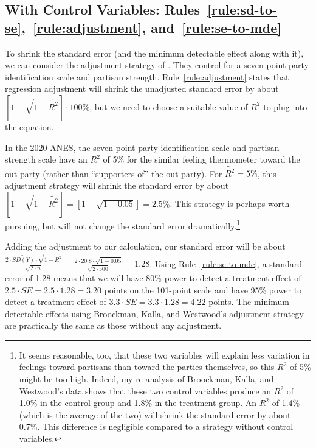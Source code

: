 \documentclass[12pt]{article}
\begin{document}
\subsection*{With Control Variables: Rules~\ref{rule:sd-to-se},~\ref{rule:adjustment}, and~\ref{rule:se-to-mde}}

To shrink the standard error (and the minimum detectable effect along with it), we can consider the adjustment strategy of \citet{Broockman2022}.
They control for a seven-point party identification scale and partisan strength.
Rule~\ref{rule:adjustment} states that regression adjustment will shrink the unadjusted standard error by about $\left\lbrack 1 - \sqrt{ 1 - \widetilde{R^{2}} } \right\rbrack \cdot 100\%$, but we need to choose a suitable value of $\widetilde{R^{2}}$ to plug into the equation.

In the 2020 ANES, the seven-point party identification scale and partisan strength scale have an $R^{2}$ of 5\% for the similar feeling thermometer toward the out-party (rather than ``supporters of'' the out-party).
For $\widetilde{R^{2}} = 5\%$, this adjustment strategy will shrink the standard error by about $\left\lbrack 1 - \sqrt{ 1 - \widetilde{R^{2}} } \right\rbrack = \left\lbrack 1 - \sqrt{1 - 0.05} \right\rbrack = 2.5\%$.
This strategy is perhaps worth pursuing, but will not change the standard error dramatically.\footnote{It seems reasonable, too, that these two variables will explain less variation in feelings toward partisans than toward the parties themselves, so this $R^{2}$ of 5\% might be too high. Indeed, my re-analysis of Broockman, Kalla, and Westwood's data shows that these two control variables produce an $R^{2}$ of 1.0\% in the control group and 1.8\% in the treatment group. An $R^{2}$ of 1.4\% (which is the average of the two) will shrink the standard error by about 0.7\%. This difference is negligible compared to a strategy without control variables.}

Adding the adjustment to our calculation, our standard error will be about $\frac{2 \cdot \widetilde{SD(Y)}\cdot \sqrt{1 - \widetilde{R^{2}}}}{\sqrt{2 \cdot n}} = \frac{2 \cdot 20.8 \cdot \sqrt{1 - 0.05}}{\sqrt{2 \cdot 500}} = 1.28$.
Using Rule~\ref{rule:se-to-mde}, a standard error of 1.28 means that we will have 80\% power to detect a treatment effect of $2.5 \cdot SE = 2.5 \cdot 1.28 = 3.20$ points on the 101-point scale and have 95\% power to detect a treatment effect of $3.3 \cdot SE = 3.3 \cdot 1.28 = 4.22$ points.
The minimum detectable effects using Broockman, Kalla, and Westwood's adjustment strategy are practically the same as those without any adjustment.
\end{document}
